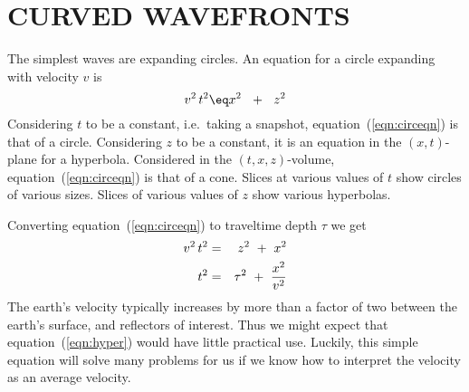 \section{CURVED WAVEFRONTS}
The simplest waves are expanding circles.
An equation for a circle expanding with velocity  $v$
is
\begin{equation}
v^2 \, t^2  \eq  x^2 \ \ +\ \ z^2
\label{eqn:circeqn}
\end{equation}
Considering  $t$  to be a constant,
i.e.~taking a snapshot, equation~(\ref{eqn:circeqn}) is that of a circle.
Considering  $z$  to be a constant,
it is an equation in the $(x , t)$-plane for a hyperbola.
Considered in the $(t , x , z)$-volume,
equation~(\ref{eqn:circeqn}) is that of a cone.
Slices at various values of  $t$  show circles of various sizes.
Slices of various values of  $z$  show various hyperbolas.
\par
Converting equation~(\ref{eqn:circeqn})
to traveltime depth $\tau$ we get
\begin{eqnarray}
v^2 \, t^2 &=& z^2 \ +\  x^2 \\
t^2        &=& \tau^2 \ +\ { x^2   \over  v^2 }
\label{eqn:hyper}
\end{eqnarray}
The earth's velocity typically increases
by more than a factor of two between the earth's surface,
and reflectors of interest.
Thus we might expect that equation~(\ref{eqn:hyper}) would have little
practical use.
Luckily, this simple equation will solve many problems for us
if we know how to interpret the velocity as an average velocity.

